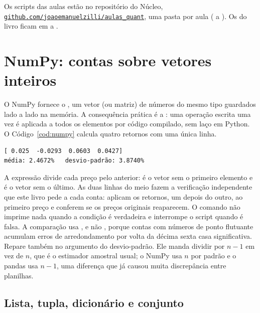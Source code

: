 \begin{repositorio}
Os scripts das aulas estão no repositório do Núcleo, \href{https://github.com/joaoemanuelzilli/aulas_quant}{\nolinkurl{github.com/joaoemanuelzilli/aulas_quant}}, uma pasta por aula ( a ). Os do livro ficam em  a .
\end{repositorio}

\section{NumPy: contas sobre vetores inteiros}

O NumPy fornece o , um vetor (ou matriz) de números do mesmo tipo guardados lado a lado na memória. A consequência prática é a : uma operação escrita uma vez é aplicada a todos os elementos por código compilado, sem laço em Python. O Código~\ref{cod:numpy} calcula quatro retornos com uma única linha.


\begin{lstlisting}[style=saida]
[ 0.025  -0.0293  0.0603  0.0427]
média: 2.4672%   desvio-padrão: 3.8740%
\end{lstlisting}

A expressão  divide cada preço pelo anterior:  é o vetor sem o primeiro elemento e  é o vetor sem o último. As duas linhas do meio fazem a verificação independente que este livro pede a cada conta: aplicam os retornos, um depois do outro, ao primeiro preço e conferem se os preços originais reaparecem. O comando  não imprime nada quando a condição é verdadeira e interrompe o script quando é falsa. A comparação usa , e não \cod{==}, porque contas com números de ponto flutuante acumulam erros de arredondamento por volta da décima sexta casa significativa. Repare também no argumento  do desvio-padrão. Ele manda dividir por $n-1$ em vez de $n$, que é o estimador amostral usual; o NumPy usa $n$ por padrão e o pandas usa $n-1$, uma diferença que já causou muita discrepância entre planilhas.

\subsection{Lista, tupla, dicionário e conjunto}
\label{sec:c01-estruturas}


